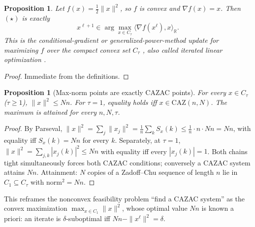\documentclass[11pt]{article}
\theoremstyle{plain}
\newtheorem{proposition}[theorem]{Proposition}
\theoremstyle{definition}
\theoremstyle{remark}
\newcommand{\R}{\mathbb R}
\newcommand{\CAZ}{\mathrm{CAZ}}
\begin{document}
\begin{proposition}\label{prop:1}
Let $f(x)=\tfrac12\|x\|^2$, so $f$ is convex and $\nabla f(x)=x$. Then
$(\star)$ is exactly
\[
x^{\ell+1}\in\arg\max_{x\in C_\tau}
    \langle\nabla f(x^\ell),x\rangle_\R.
\]
This is the conditional-gradient or generalized-power-method update for
maximizing $f$ over the compact convex set $C_\tau$ \cite{JNRS10}, also
called iterated linear optimization \cite{FKP21}.
\end{proposition}
\begin{proof}
Immediate from the definitions.
\end{proof}

\begin{proposition}[Max-norm points are exactly CAZAC points]\label{prop:2}
For every $x\in C_\tau$ ($\tau\ge1$), $\|x\|^2\le Nn$. For $\tau=1$,
equality holds iff $x\in\CAZ(n,N)$. The maximum is attained for every
$n,N,\tau$.
\end{proposition}
\begin{proof}
By Parseval, $\|x\|^2=\sum_j\|x_j\|^2=\tfrac1n\sum_k S_x(k)\le\tfrac1n\cdot n\cdot Nn=Nn$,
with equality iff $S_x(k)=Nn$ for every $k$. Separately, at $\tau=1$,
$\|x\|^2=\sum_{j,k}|x_j(k)|^2\le Nn$ with equality iff every $|x_j(k)|=1$.
Both chains tight simultaneously forces both CAZAC conditions; conversely a
CAZAC system attains $Nn$. Attainment: $N$ copies of a Zadoff--Chu sequence
of length $n$ lie in $C_1\subseteq C_\tau$ with norm$^2=Nn$.
\end{proof}

This reframes the nonconvex feasibility problem ``find a CAZAC system'' as
the convex maximization $\max_{x\in C_1}\|x\|^2$, whose optimal value $Nn$
is known a priori: an iterate is $\delta$-suboptimal iff $Nn-\|x^\ell\|^2=\delta$.
\end{document}

